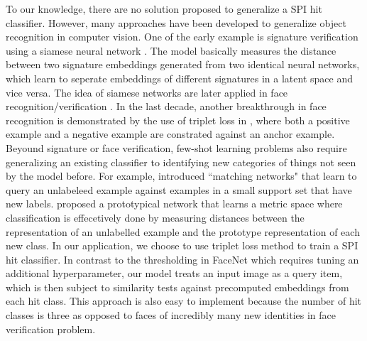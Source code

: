 To our knowledge, there are no solution proposed to generalize a SPI hit
classifier.  However, many approaches have been developed to generalize object
recognition in computer vision.  One of the early example is signature
verification using a siamese neural network
\cite{bromleySignatureVerificationUsing1994}.  The model basically measures the
distance between two signature embeddings generated from two identical neural
networks, which learn to seperate embeddings of different signatures in a latent
space and vice versa.  The idea of siamese networks are later applied in face
recognition/verification \cite{chopraLearningSimilarityMetric2005}.  In the last
decade, another breakthrough in face recognition is demonstrated by the use of
triplet loss in \cite{kochSiameseNeuralNetworks2015a}, where both a positive
example and a negative example are constrated against an anchor example. Beyound
signature or face verification, few-shot learning problems also require
generalizing an existing classifier to identifying new categories of things not
seen by the model before.  For example, \cite{vinyalsMatchingNetworksOne2017}
introduced ``matching networks" that learn to query an unlabeleed example
against examples in a small support set that have new labels.
\cite{snellPrototypicalNetworksFewshot2017} proposed a prototypical network that
learns a metric space where classification is effecetively done by measuring
distances between the representation of an unlabelled example and the prototype
representation of each new class.  In our application, we choose to use triplet
loss method to train a SPI hit classifier.  In contrast to the thresholding in
FaceNet which requires tuning an additional hyperparameter, our model treats an
input image as a query item, which is then subject to similarity tests against
precomputed embeddings from each hit class.  This approach is also easy to
implement because the number of hit classes is three as opposed to faces of
incredibly many new identities in face verification problem.  
